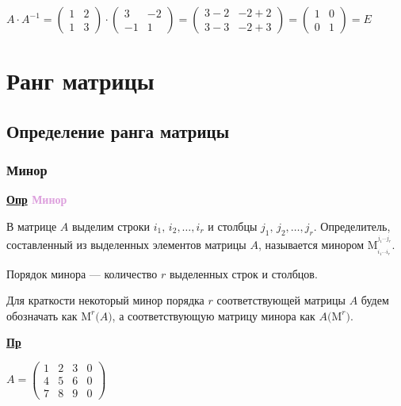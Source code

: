 \documentclass[12pt, a4paper]{report}
\newcommand{\df}[1][]{\begin{flushleft}\textbf{\underline{Опр} \textcolor{Plum}{#1}}\end{flushleft}}
\newcommand{\ex}{\begin{flushleft}\textbf{\underline{Пр}}\end{flushleft}}
\newcommand{\inlineperm}[3][i]{{#1}_{#2}\dotsb{#1}_{#3}}
\begin{document}
	\bigskip\(A\cdot A^{-1}=\begin{pmatrix}1&2\\1&3\end{pmatrix}\cdot\begin{pmatrix}3&-2\\-1&1\end{pmatrix}=\begin{pmatrix}3-2&-2+2\\3-3&-2+3\end{pmatrix}=\begin{pmatrix}1&0\\0&1\end{pmatrix}=E\)
	
	\chapter{Ранг матрицы}
	\section{Определение ранга матрицы}
	\subsection{Минор}
	\df[Минор]
	
	В матрице \(A\) выделим строки \(i_1,\,i_2,\dotsc,i_r\) и столбцы \(j_1,\,j_2,\dotsc,j_r\). Определитель, составленный из выделенных элементов матрицы \(A\), называется минором \(\mathrm{M}_{_{\inlineperm{1}{r}}}^{^{\inlineperm[j]{1}{r}}}\).
	
	\smallskip Порядок минора --- количество \(r\) выделенных строк и столбцов. 
	
	Для краткости некоторый минор порядка \(r\) соответствующей матрицы \(A\) будем обозначать как \(\mathrm{M}^{r}\big(A\big)\), а соответствующую матрицу минора как \(A\big(\mathrm{M}^{r}\big)\).
	
	\ex
	
	\(A=\begin{pmatrix}1&2&3&0\\4&5&6&0\\7&8&9&0\end{pmatrix}\)
	
\end{document}
